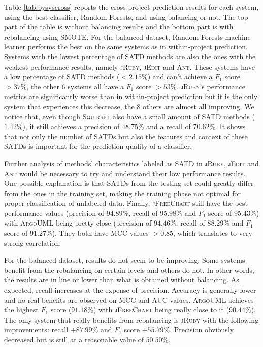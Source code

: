 Table \ref{tab:bysyscross} reports the cross-project prediction results for each system, using the best classifier, Random Forests, and using balancing or not. The top part of the table is without balancing results and the bottom part is with rebalancing using SMOTE. For the balanced dataset, Random Forests machine learner performs the best on the same systems as in within-project prediction. Systems with the lowest percentage of SATD methods are also the ones with the weakest performance results, namely \textsc{jRuby}, \textsc{jEdit} and \textsc{Ant}. These systems have a low percentage of SATD methods ($<2.15\%$) and can't achieve a $F_1$ score $>37\%$, the other 6 systems all have a $F_1$ score $>53\%$. \textsc{jRuby}'s performance metrics are significantly worse than in within-project prediction but it is the only system that experiences this decrease, the 8 others are almost all improving. We notice that, even though \textsc{Squirrel} also have a small amount of SATD methods ($1.42\%$), it still achieves a precision of $48.75\%$ and a recall of $70.62\%$. It shows that not only the number of SATDs but also the features and context of these SATDs is important for the prediction quality of a classifier. 

Further analysis of methods' characteristics labeled as SATD in \textsc{jRuby, jEdit} and \textsc{Ant} would be necessary to try and understand their low performance results. One possible explanation is that SATDs from the testing set could greatly differ from the ones in the training set, making the training phase not optimal for proper classification of unlabeled data. Finally, \textsc{jFreeChart} still have the best performance values (precision of $94.89\%$, recall of $95.98\%$ and $F_1$ score of $95.43\%$) with \textsc{ArgoUML} being pretty close (precision of $94.46\%$, recall of $88.29\%$ and $F_1$ score of $91.27\%$). They both have MCC values $>0.85$, which translates to very strong correlation.

For the balanced dataset, results do not seem to be improving. Some systems benefit from the rebalancing on certain levels and others do not. In other words, the results are in line or lower than what is obtained without balancing. As expected, recall increases at the expense of precision. Accuracy is generally lower and no real benefits are observed on MCC and AUC values. \textsc{ArgoUML} achieves the highest $F_1$ score ($91.18\%$) with \textsc{jFreeChart} being really close to it ($90.44\%$). The only system that really benefits from rebalancing is \textsc{jRuby} with the following improvements: recall $+87.99\%$ and $F_1$ score $+55.79\%$. Precision obviously decreased but is still at a reasonable value of $50.50\%$. 

